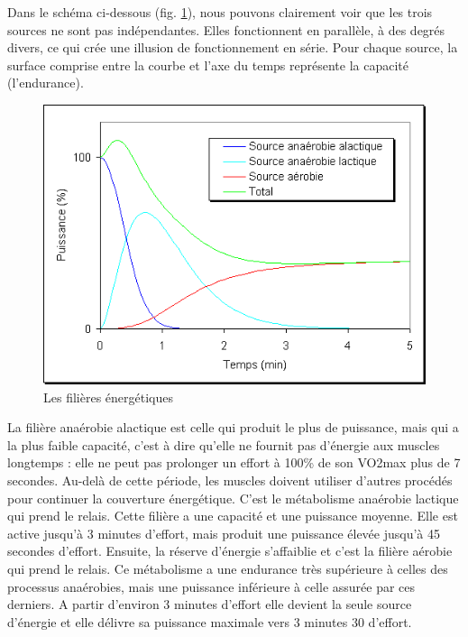          Dans le schéma ci-dessous (fig. \ref{fig:filieres-energetiques}), nous pouvons clairement voir que les trois sources ne sont pas indépendantes. Elles fonctionnent en parallèle, à des degrés divers, ce qui crée une illusion de fonctionnement en série. Pour chaque source, la surface comprise entre la courbe et l'axe du temps représente la capacité (l'endurance).\\
         
         \begin{figure}[H]
            \centering
            \includegraphics[scale=0.75]{images/aerobie-anaerobie-alactique2.png}
            \caption{\label{fig:filieres-energetiques}Les filières énergétiques}
         \end{figure} 
         
         
         La filière anaérobie alactique est celle qui produit le plus de puissance, mais qui a la plus faible capacité, c'est à dire qu'elle ne fournit pas d'énergie aux muscles longtemps : elle ne peut pas prolonger un effort à 100\% de son VO2max plus de 7 secondes. Au-delà de cette période, les muscles doivent utiliser d’autres procédés pour continuer la couverture énergétique. C'est le métabolisme anaérobie lactique qui prend le relais. Cette filière a une capacité et une puissance moyenne. Elle est active jusqu'à 3 minutes d'effort, mais produit une puissance élevée jusqu'à 45 secondes d'effort. Ensuite, la réserve d'énergie s'affaiblie et c'est la filière aérobie qui prend le relais. Ce métabolisme a une endurance très supérieure à celles des processus anaérobies, mais une puissance inférieure à celle assurée par ces derniers. A partir d'environ 3 minutes d'effort elle devient la seule source d'énergie et elle délivre sa puissance maximale vers 3 minutes 30 d'effort.\\
        

